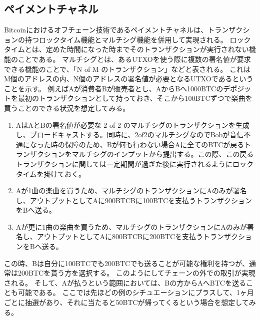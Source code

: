 \subsection{ペイメントチャネル}
Bitcoinにおけるオフチェーン技術であるペイメントチャネルは、トランザクションの持つロックタイム機能とマルチシグ機能を併用して実現される。
ロックタイムとは、定めた時間になった時までそのトランザクションが実行されない機能のことである。
マルチシグとは、あるUTXOを使う際に複数の署名値が要求できる機能のことで、「N of M のトランザクション」などと表される。
これはM個のアドレスの内、N個のアドレスの署名値が必要となるUTXOであるということを示す。
例えばAが消費者Bが販売者とし、AからBへ1000BTCのデポジットを最初のトランザクションとして持っておき、そこから100BTCずつで楽曲を買うことのできる状況を想定してみる。
\begin{enumerate}
\item AはAとBの署名値が必要な 2 of 2 のマルチシグのトランザクションを生成し、ブロードキャストする。同時に、2of2のマルチシグなのでBobが音信不通になった時の保障のため、Bが何も行わない場合Aに全てのBTCが戻るトランザクションをマルチシグのインプットから提出する。この際、この戻るトランザクションに関しては一定期間が過ぎた後に実行されるようにロックタイムを掛けておく。
\item Aが1曲の楽曲を買うため、マルチシグのトランザクションにAのみが署名し、アウトプットとしてAに900BTCBに100BTCを支払うトランザクションをBへ送る。
\item Aが更に1曲の楽曲を買うため、マルチシグのトランザクションにAのみが署名し、アウトプットとしてAに800BTCBに200BTCを支払うトランザクションをBへ送る。
\end{enumerate}
この時、Bは自分に100BTCでも200BTCでも送ることが可能な権利を持つが、通常は200BTCを貰う方を選択する。
このようにしてチェーンの外での取引が実現される。
そして、Aが払うという範囲においては、Bの方からAへBTCを送ることも可能である。
ここでは先ほどの例のシチュエーションにプラスして、1ヶ月ごとに抽選があり、それに当たると50BTCが帰ってくるという場合を想定してみる。
